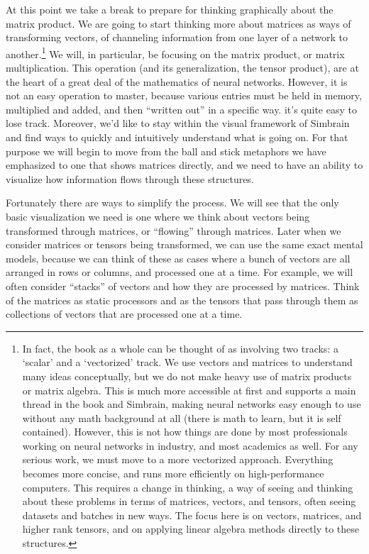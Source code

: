 At this point we take a break to prepare for thinking graphically about the matrix product. We are going to start thinking more about matrices as ways of transforming vectors, of channeling information from one layer of a network to another.\footnote{In fact, the book as a whole can be thought of as involving two tracks: a `scalar' and a `vectorized' track. We use vectors and matrices to understand many ideas conceptually, but we do not make heavy use of matrix products or matrix algebra. This is much more accessible at first and supports a main thread in the book and Simbrain, making neural networks easy enough to use without any math background at all (there is math to learn, but it is self contained). However, this is not how things are done by most professionals working on neural networks in industry, and most academics as well. For any serious work, we must move to a more vectorized approach. Everything becomes more concise, and runs more efficiently on high-performance computers. This requires a change in thinking, a way of seeing and thinking about these problems in terms of matrices, vectors, and tensors, often seeing datasets and batches in new ways. The focus here is on vectors, matrices, and higher rank tensors, and on applying linear algebra methods directly to these structures.} We will, in particular, be focusing on  the matrix product, or matrix multiplication. This operation (and its generalization, the tensor product), are at the heart of a great deal of the mathematics of neural networks. However, it is not an easy operation to master, because various entries must be held in memory, multiplied and added, and then ``written out'' in a specific way.  it's quite easy to lose track.  Moreover, we'd like to stay within the visual framework of Simbrain and find ways to quickly and intuitively understand what is going on. For that purpose we will begin to move from the ball and stick metaphors we have emphasized to one that shows matrices directly, and we need to have an ability to visualize how information flows through these structures.

Fortunately there are ways to simplify the process. We will see that the only basic visualization we need is one where we think about vectors being transformed through matrices, or ``flowing'' through matrices.  Later when we consider matrices or tensors being transformed, we can use the same exact mental models, because we can think of these as cases where a bunch of vectors are all arranged in rows or columns, and processed one at a time. For example, we will often consider ``stacks'' of vectors and how they are processed by matrices.  Think of the matrices as static processors and as the tensors that pass through them as collections of vectors that are processed one at a time.

